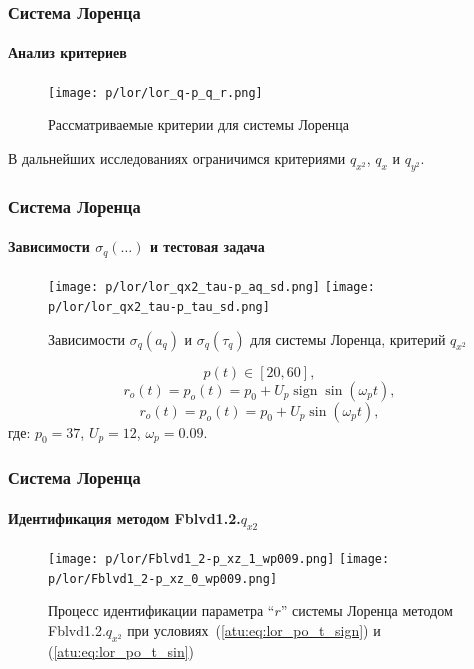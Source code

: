 \documentclass[10pt,utf8]{beamer}
\DeclareMathOperator*{\sign}{sign}
\begin{document}

\begin{frame}
  \frametitle{Система Лоренца}
  \framesubtitle{Анализ критериев}


  \begin{figure}[h!]
    \centerline{\texttt{[image: p/lor/lor\_q-p\_q\_r.png]} }
    \caption{Рассматриваемые критерии для системы Лоренца}
    \label{atu:f:lor_q}
  \end{figure}

В дальнейших исследованиях ограничимся
критериями
  $q_{x^2}$, ${q_{x}}$ и $q_{y^2}$.

\end{frame}




\begin{frame}
  \frametitle{Система Лоренца}
  \framesubtitle{Зависимости $\sigma_{q}(\ldots)$ и тестовая задача}
  \begin{figure}[h!]
  \begin{center}
    \texttt{[image: p/lor/lor\_qx2\_tau-p\_aq\_sd.png]}
    \hfill
    \texttt{[image: p/lor/lor\_qx2\_tau-p\_tau\_sd.png]}
  \end{center}
  \caption{Зависимости $\sigma_{q}(a_q)$ и $\sigma_{q}(\tau_q)$ для системы Лоренца, критерий $q_{x^2}$}
  \label{atu:f:lor_qx2_tau}
  \end{figure}

  \vspace{-3ex}
  \[
    p(t) \in [20, 60],
  \]
  \begin{equation}
    r_o(t) = p_o(t) = p_0 +  U_{p} \sign \sin( \omega_{p} t ),
    \label{atu:eq:lor_po_t_sign}
  \end{equation}
  \begin{equation}
    r_o(t) = p_o(t) = p_0 +  U_{p} \sin( \omega_{p} t ),
    \label{atu:eq:lor_po_t_sin}
  \end{equation}
  где:
  $p_0 = 37$, $U_p=12$, $\omega_p=0.09$.

\end{frame}




\begin{frame}
  \frametitle{Система Лоренца}
  \framesubtitle{Идентификация методом  Fblvd1.2.$q_{x2}$ }


\begin{figure}[h!]
  \centerline{
    \texttt{[image: p/lor/Fblvd1\_2-p\_xz\_1\_wp009.png]}
    \hfill
    \texttt{[image: p/lor/Fblvd1\_2-p\_xz\_0\_wp009.png]}
  }
  \caption{Процесс идентификации параметра ``$r$'' системы Лоренца методом Fblvd1.2.$q_{x^2}$ при условиях~(\ref{atu:eq:lor_po_t_sign}) и (\ref{atu:eq:lor_po_t_sin})}
  \label{atu:f:lor_id_Fblvd1}
\end{figure}

\end{frame}
\end{document}
